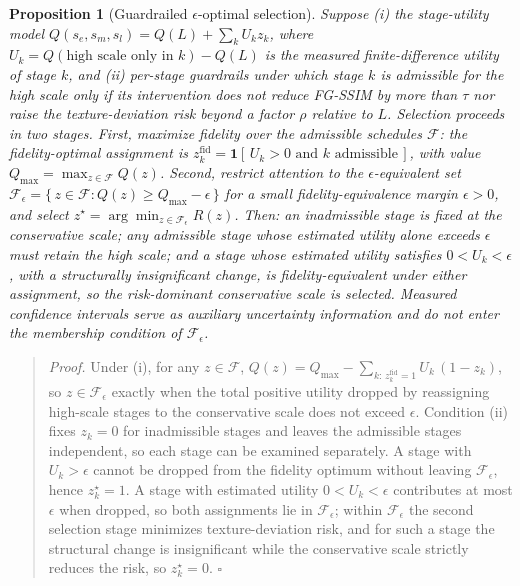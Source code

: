 \documentclass[times,twocolumn,final]{elsarticle}
\newtheorem{proposition}{Proposition} %
\providecommand{\DIFadd}[1]{{\protect\color{blue} \sf #1}} %
\begin{document}
\begin{proposition}[Guardrailed $\epsilon$-optimal selection]
\label{prop:cai}
\DIFadd{Suppose (i) the stage-utility model $Q(s_e,s_m,s_l)=Q(L)+\sum_{k}U_k z_k$, where $U_k=Q(\text{high scale only in }k)-Q(L)$ is the measured finite-difference utility of stage $k$, and (ii) per-stage guardrails under which stage $k$ is admissible for the high scale only if its intervention does not reduce FG-SSIM by more than $\tau$ nor raise the texture-deviation risk beyond a factor $\rho$ relative to $L$. Selection proceeds in two stages. First, maximize fidelity over the admissible schedules $\mathcal{F}$: the fidelity-optimal assignment is $z_k^{\mathrm{fid}}=\mathbf{1}[\,U_k>0 \text{ and } k \text{ admissible}\,]$, with value $Q_{\max}=\max_{z\in\mathcal{F}}Q(z)$. Second, restrict attention to the $\epsilon$-equivalent set $\mathcal{F}_\epsilon=\{\,z\in\mathcal{F}: Q(z)\ge Q_{\max}-\epsilon\,\}$ for a small fidelity-equivalence margin $\epsilon>0$, and select $z^{\star}=\arg\min_{z\in\mathcal{F}_\epsilon}R(z)$. Then: an inadmissible stage is fixed at the conservative scale; any admissible stage whose estimated utility alone exceeds $\epsilon$ must retain the high scale; and a stage whose estimated utility satisfies $0<U_k<\epsilon$, with a structurally insignificant change, is fidelity-equivalent under either assignment, so the risk-dominant conservative scale is selected. Measured confidence intervals serve as auxiliary uncertainty information and do not enter the membership condition of $\mathcal{F}_\epsilon$.
}\end{proposition}

\begin{quote}\small
\DIFadd{\textit{Proof.} Under (i), for any $z\in\mathcal{F}$, $Q(z)=Q_{\max}-\sum_{k:\,z_k^{\mathrm{fid}}=1}U_k\,(1-z_k)$, so $z\in\mathcal{F}_\epsilon$ exactly when the total positive utility dropped by reassigning high-scale stages to the conservative scale does not exceed $\epsilon$. Condition (ii) fixes $z_k=0$ for inadmissible stages and leaves the admissible stages independent, so each stage can be examined separately. A stage with $U_k>\epsilon$ cannot be dropped from the fidelity optimum without leaving $\mathcal{F}_\epsilon$, hence $z_k^{\star}=1$. A stage with estimated utility $0<U_k<\epsilon$ contributes at most $\epsilon$ when dropped, so both assignments lie in $\mathcal{F}_\epsilon$; within $\mathcal{F}_\epsilon$ the second selection stage minimizes texture-deviation risk, and for such a stage the structural change is insignificant while the conservative scale strictly reduces the risk, so $z_k^{\star}=0$. }\hfill\DIFadd{$\square$
}\end{quote}
\end{document}
